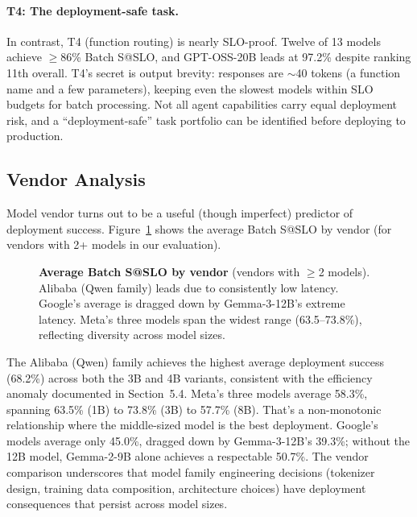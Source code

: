 \documentclass[11pt]{article}
\begin{document}
\paragraph{T4: The deployment-safe task.}
In contrast, T4 (function routing) is nearly SLO-proof.  Twelve of 13 models achieve $\geq$86\% Batch S@SLO, and GPT-OSS-20B leads at 97.2\% despite ranking 11th overall.  T4's secret is output brevity: responses are $\sim$40 tokens (a function name and a few parameters), keeping even the slowest models within SLO budgets for batch processing.  Not all agent capabilities carry equal deployment risk, and a ``deployment-safe'' task portfolio can be identified before deploying to production.

\subsection{Vendor Analysis}

Model vendor turns out to be a useful (though imperfect) predictor of deployment success.  Figure~\ref{fig:vendor} shows the average Batch S@SLO by vendor (for vendors with 2+ models in our evaluation).

\begin{figure}[t]
\centering
{}
\caption{\textbf{Average Batch S@SLO by vendor} (vendors with $\geq$2 models).  Alibaba (Qwen family) leads due to consistently low latency.  Google's average is dragged down by Gemma-3-12B's extreme latency.  Meta's three models span the widest range (63.5--73.8\%), reflecting diversity across model sizes.}
\label{fig:vendor}
\end{figure}

The Alibaba (Qwen) family achieves the highest average deployment success (68.2\%) across both the 3B and 4B variants, consistent with the efficiency anomaly documented in Section~5.4.  Meta's three models average 58.3\%, spanning 63.5\% (1B) to 73.8\% (3B) to 57.7\% (8B).  That's a non-monotonic relationship where the middle-sized model is the best deployment.  Google's models average only 45.0\%, dragged down by Gemma-3-12B's 39.3\%; without the 12B model, Gemma-2-9B alone achieves a respectable 50.7\%.  The vendor comparison underscores that model family engineering decisions (tokenizer design, training data composition, architecture choices) have deployment consequences that persist across model sizes.
\end{document}

